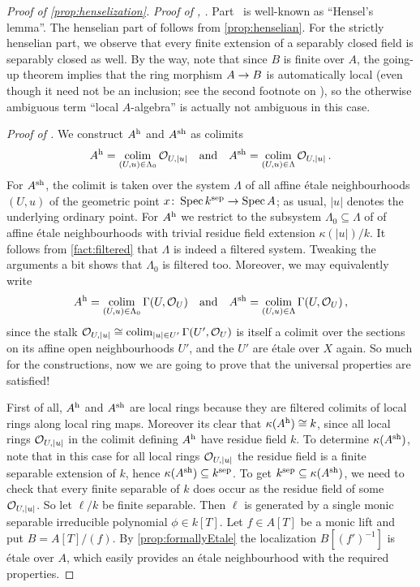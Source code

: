 \documentclass[a4paper, 10pt, oneside, DIV=9, chapterprefix=true, numbers=enddot, bibliography=totoc]{scrbook}
\begin{document}
\begin{proof}[Proof of \cref{prop:henselization}]
	\emph{Proof of , .} Part~ is well-known as \enquote{Hensel's lemma}. The henselian part of  follows from \cref{prop:henselian}. For the strictly henselian part, we observe that every finite extension of a separably closed field is separably closed as well. By the way, note that since $B$ is finite over $A$, the going-up theorem implies that the ring morphism $A\morphism B$ is automatically local (even though it need not be an inclusion; see the second footnote on ), so the otherwise ambiguous term \enquote{local $A$-algebra} is actually not ambiguous in this case. 
	
	\emph{Proof of .} We construct $A^{\mathrm{h}}$ and $A^{\mathrm{sh}}$ as colimits
	\begin{equation}\label{eq:AhColim1}
		A^{\mathrm{h}}=\operatorname*{colim}_{(U,u)\in \Lambda_0}\mathcal{O}_{U,|u|}\quad\text{and}\quad A^{\mathrm{sh}}=\operatorname*{colim}_{(U,u)\in\Lambda} \mathcal{O}_{U,|u|}\,.
	\end{equation}
	For $A^{\mathrm{sh}}$, the colimit is taken over the system $\Lambda$ of all affine étale neighbourhoods $(U,u)$ of the geometric point $x\colon \Spec k^\sep\morphism \Spec A$; as usual, $|u|$ denotes the underlying ordinary point. For $A^{\mathrm{h}}$ we restrict to the subsystem $\Lambda_0\subseteq \Lambda$ of of affine étale neighbourhoods with trivial residue field extension $\kappa(|u|)/k$. It follows from \cref{fact:filtered} that $\Lambda$ is indeed a filtered system. Tweaking the arguments a bit shows that $\Lambda_0$ is filtered too. Moreover, we may equivalently write 
	\begin{equation}\label{eq:AhColim2}
		A^{\mathrm{h}}=\operatorname*{colim}_{(U,u)\in\Lambda_0}\operatorname{\Gamma}(U,\mathcal{O}_U)\quad\text{and}\quad A^{\mathrm{sh}}=\operatorname*{colim}_{(U,u)\in\Lambda}\operatorname{\Gamma}(U,\mathcal{O}_U)\,,
	\end{equation}
	since the stalk $\mathcal{O}_{U,|u|}\cong \operatorname*{colim}_{|u|\in U'}\operatorname{\Gamma}(U',\mathcal{O}_U)$ is itself a colimit over the sections on its affine open neighbourhoods $U'$, and the $U'$ are étale over $X$ again. So much for the constructions, now we are going to prove that the universal properties are satisfied!
	
	First of all, $A^{\mathrm{h}}$ and $A^{\mathrm{sh}}$ are local rings because they are filtered colimits of local rings along local ring maps. Moreover its clear that $\kappa(A^{\mathrm{h}})\cong k$, since all local rings $\mathcal{O}_{U,|u|}$ in the colimit defining $A^{\mathrm{h}}$ have residue field $k$. To determine $\kappa(A^{\mathrm{sh}})$, note that in this case for all local rings $\mathcal{O}_{U,|u|}$ the residue field is a finite separable extension of $k$, hence $\kappa(A^{\mathrm{sh}})\subseteq k^{\mathrm{sep}}$. To get $k^{\mathrm{sep}}\subseteq \kappa(A^{\mathrm{sh}})$, we need to check that every finite separable of $k$ does occur as the residue field of some $\mathcal{O}_{U,|u|}$. So let $\ell/k$ be finite separable. Then $\ell$ is generated by a single monic separable irreducible polynomial $\phi\in k[T]$. Let $f\in A[T]$ be a monic lift and put $B=A[T]/(f)$. By \cref{prop:formallyEtale} the localization $B[(f')^{-1}]$ is étale over $A$, which easily provides an étale neighbourhood with the required properties.
	

\end{proof}
\end{document}
